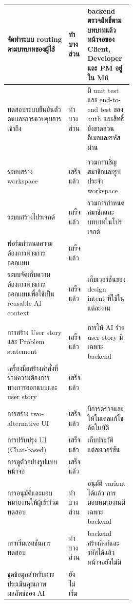 \begin{xltabular}{\linewidth}{|>{\RaggedRight\arraybackslash}X|>{\RaggedRight\arraybackslash}p{0.15\linewidth}|>{\RaggedRight\arraybackslash}p{0.36\linewidth}|}
  จัดทำระบบ routing ตามบทบาทของผู้ใช้ & ทำบางส่วน & backend ตรวจสิทธิ์ตามบทบาทแล้ว หน้าจอของ Client, Developer และ PM อยู่ใน M6 \\ \hline
  ทดสอบระบบยืนยันตัวตนและการควบคุมการเข้าถึง & ทำบางส่วน & มี unit test และ end-to-end test ของ auth และสิทธิ์ ยังขาดส่วนอีเมลและรหัสผ่าน \\ \hline
   \\ \hline
  ระบบสร้าง workspace & เสร็จแล้ว & รวมการเชิญสมาชิกและรูปประจำ workspace \\ \hline
  ระบบสร้างโปรเจกต์ & เสร็จแล้ว & รวมการกำหนดสมาชิกและบทบาทในโปรเจกต์ \\ \hline
  ฟอร์มกำหนดความต้องการทางการออกแบบ & เสร็จแล้ว &  \\ \hline
  ระบบจัดเก็บความต้องการทางการออกแบบเพื่อใช้เป็น reusable AI context & เสร็จแล้ว & เก็บเวอร์ชันของ design intent ที่ใช้ในแต่ละงาน \\ \hline
   \\ \hline
  การสร้าง User story และ Problem statement & เสร็จแล้ว & การให้ AI ร่าง user story มีเฉพาะ backend \\ \hline
  เครื่องมือสร้างคำสั่งที่รวมความต้องการทางการออกแบบและ user story & เสร็จแล้ว &  \\ \hline
  การสร้าง two-alternative UI & เสร็จแล้ว & มีการตรวจและให้โมเดลแก้ไขอัตโนมัติ \\ \hline
  การปรับปรุง UI (Chat-based) & เสร็จแล้ว & เก็บประวัติแต่ละเวอร์ชัน \\ \hline
  การดูตัวอย่างรูปแบบหน้าจอ & เสร็จแล้ว &  \\ \hline
  การอนุมัติและมอบหมายงานให้ผู้เข้าร่วมทดสอบ & ทำบางส่วน & อนุมัติ variant ได้แล้ว การมอบหมายงานมีเฉพาะ backend \\ \hline
  การเริ่มเซสชันการทดสอบ & ทำบางส่วน & backend สร้างลิงก์และรหัสได้แล้ว หน้าจอยังไม่มี \\ \hline
  ชุดข้อมูลสำหรับการประเมินคุณภาพผลลัพธ์ของ AI & ยังไม่เริ่ม &  \\ \hline
\end{xltabular}
\endgroup
{}

